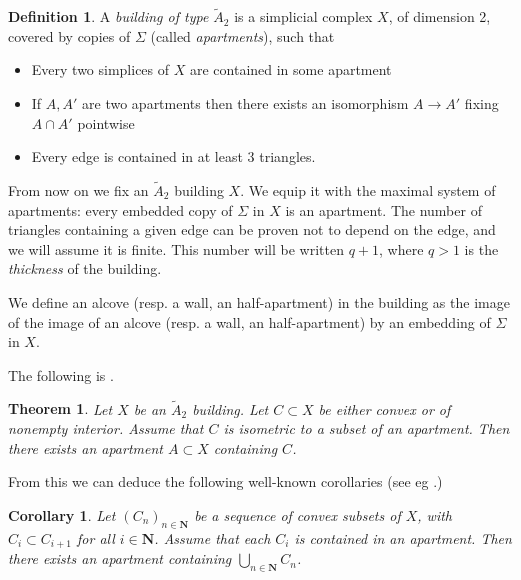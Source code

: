 \documentclass[a4paper, 11pt]{article}
\theoremstyle{plain}
\newtheorem{theorem}[proposition]{Theorem}
\newtheorem{corollary}[proposition]{Corollary}
\theoremstyle{definition}
\newtheorem{definition}[proposition]{Definition}
\theoremstyle{remark}
\newcommand{\NN}{\mathbf{N}}                          %
\begin{document}
\begin{definition}
 A \emph{building of type $\tilde A_2$} is a simplicial complex $X$, of dimension 2, covered by copies of $\Sigma$ (called \emph{apartments}), such that
 \begin{itemize}
     \item Every two simplices of $X$ are contained in some apartment
     \item If $A,A'$ are two apartments then there exists an isomorphism $A\to A'$ fixing $A\cap A'$ pointwise
     \item Every edge is contained in at least 3 triangles.
 \end{itemize}
\end{definition}

From now on we fix an $\tilde A_2$ building $X$. We equip it with the maximal system of apartments: every embedded copy of $\Sigma$ in $X$ is an apartment. The number of triangles containing a given edge can be proven not to depend on the edge, and we will assume it is finite. This number will be written $q+1$, where $q>1$ is the \emph{thickness} of the building.

We define an alcove (resp. a wall, an half-apartment) in the building as the image of the image of an alcove (resp. a wall, an half-apartment) by an embedding of $\Sigma$ in $X$.



  

The following is \cite[Theorem 11.52]{AbramenkoBrown}.

\begin{theorem}\label{thm:isomappart}
Let $X$ be an $\tilde A_2$ building. Let $C\subset X$ be either convex or of nonempty interior. Assume that $C$ is isometric to a subset of an apartment. Then there exists an apartment $A\subset X$ containing $C$.
\end{theorem}

From this we can deduce the following well-known corollaries (see eg \cite[Exercice 5.83a)]{AbramenkoBrown}.)

\begin{corollary}\label{cor:sequenceappt}
Let $(C_n)_{n\in \NN}$ be a sequence of convex subsets of $X$, with $C_i\subset C_{i+1}$ for all $i\in \NN$. Assume that each $C_i$ is contained in an apartment. Then there exists an apartment containing $\bigcup_{n\in\NN} C_n$.
\end{corollary}
\end{document}
